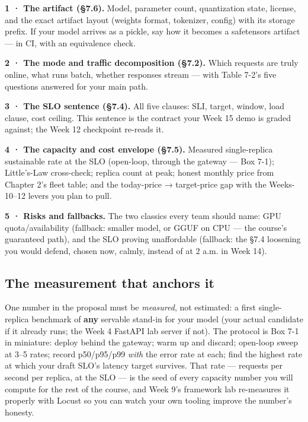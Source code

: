 \begin{tbbitemize}
  \item \textbf{1 · The artifact (§7.6).} Model, parameter count, quantization state, license, and the exact artifact layout (weights format, tokenizer, config) with its storage prefix. If your model arrives as a pickle, say how it becomes a safetensors artifact — in CI, with an equivalence check.
  \item \textbf{2 · The mode and traffic decomposition (§7.2).} Which requests are truly online, what runs batch, whether responses stream — with Table 7-2's five questions answered for your main path.
  \item \textbf{3 · The SLO sentence (§7.4).} All five clauses: SLI, target, window, load clause, cost ceiling. This sentence is the contract your Week 15 demo is graded against; the Week 12 checkpoint re-reads it.
  \item \textbf{4 · The capacity and cost envelope (§7.5).} Measured single-replica sustainable rate at the SLO (open-loop, through the gateway — Box 7-1); Little's-Law cross-check; replica count at peak; honest monthly price from Chapter 2's fleet table; and the today-price → target-price gap with the Weeks-10–12 levers you plan to pull.
  \item \textbf{5 · Risks and fallbacks.} The two classics every team should name: GPU quota/availability (fallback: smaller model, or GGUF on CPU — the course's guaranteed path), and the SLO proving unaffordable (fallback: the §7.4 loosening you would defend, chosen now, calmly, instead of at 2 a.m. in Week 14).
\end{tbbitemize}

\subsection*{The measurement that anchors it}

One number in the proposal must be \textit{measured}, not estimated: a first single-replica benchmark of \textbf{any} servable stand-in for your model (your actual candidate if it already runs; the Week 4 FastAPI lab server if not). The protocol is Box 7-1 in miniature: deploy behind the gateway; warm up and discard; open-loop sweep at 3–5 rates; record p50/p95/p99 \textit{with} the error rate at each; find the highest rate at which your draft SLO's latency target survives. That rate — requests per second per replica, at the SLO — is the seed of every capacity number you will compute for the rest of the course, and Week 9's framework lab re-measures it properly with Locust so you can watch your own tooling improve the number's honesty.

